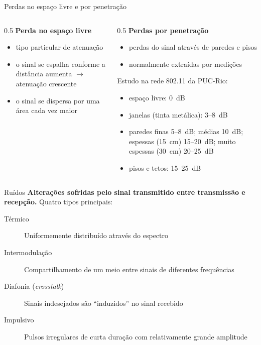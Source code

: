 \documentclass[aspectratio=169,11pt]{beamer}
\begin{document}
\begin{frame}{Perdas no espaço livre e por penetração}
  \begin{columns}
    \begin{column}{0.5\textwidth}
      \textbf{Perda no espaço livre}
      \begin{itemize}
        \item tipo particular de atenuação
        \item o sinal se espalha conforme a distância aumenta $\rightarrow$ atenuação crescente
        \item o sinal se dispersa por uma área cada vez maior
      \end{itemize}
    \end{column}
    \begin{column}{0.5\textwidth}
      \textbf{Perdas por penetração}
      \begin{itemize}
        \item perdas do sinal através de paredes e pisos
        \item normalmente extraídas por medições
      \end{itemize}
      Estudo na rede 802.11 da PUC-Rio:
      \begin{itemize}
        \item espaço livre: 0~dB
        \item janelas (tinta metálica): 3--8~dB
        \item paredes finas 5--8~dB; médias 10~dB; espessas (15~cm) 15--20~dB; muito espessas (30~cm) 20--25~dB
        \item pisos e tetos: 15--25~dB
      \end{itemize}
    \end{column}
  \end{columns}
\end{frame}

\begin{frame}{Ruídos}
  \textbf{Alterações sofridas pelo sinal transmitido entre transmissão e recepção.} Quatro tipos principais:
  \begin{description}
    \item[Térmico] Uniformemente distribuído através do espectro
    \item[Intermodulação] Compartilhamento de um meio entre sinais de diferentes frequências
    \item[Diafonia (\emph{crosstalk})] Sinais indesejados são ``induzidos'' no sinal recebido
    \item[Impulsivo] Pulsos irregulares de curta duração com relativamente grande amplitude
  \end{description}
\end{frame}
\end{document}
